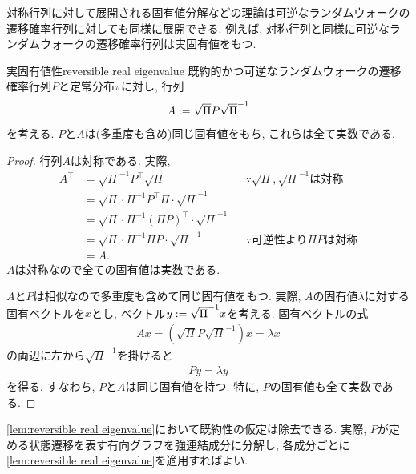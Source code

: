 対称行列に対して展開される固有値分解などの理論は可逆なランダムウォークの遷移確率行列に対しても同様に展開できる.
例えば, 対称行列と同様に可逆なランダムウォークの遷移確率行列は実固有値をもつ.
\begin{lemma}{実固有値性}{reversible real eigenvalue}
    既約的かつ可逆なランダムウォークの遷移確率行列$P$と定常分布$\pi$に対し,
    行列
    \begin{align}
        A \mathrel{:=} \sqrt{\Pi} P \sqrt{\Pi}^{-1} \label{eq: symmetrized P}
    \end{align}
    を考える.
    $P$と$A$は(多重度も含め)同じ固有値をもち, これらは全て実数である.
\end{lemma}
\begin{proof}
    行列$A$は対称である.
    実際,
    \begin{align*}
        A^\top & = \sqrt{\Pi}^{-1} P^{\top} \sqrt{\Pi}                            &  & \text{$\because$$\sqrt{\Pi},\sqrt{\Pi}^{-1}$は対称} \\
               & = \sqrt{\Pi} \cdot \Pi^{-1} P^{\top} \Pi \cdot \sqrt{\Pi}^{-1}                                                         \\
               & = \sqrt{\Pi} \cdot \Pi^{-1} (\Pi P)^{\top} \cdot \sqrt{\Pi}^{-1}                                                       \\
               & = \sqrt{\Pi} \cdot \Pi^{-1} \Pi P \cdot \sqrt{\Pi}^{-1}          &  & \text{$\because$可逆性より$\Pi P$は対称}                 \\
               & = A.
    \end{align*}
    $A$は対称なので全ての固有値は実数である.

    $A$と$P$は相似なので多重度も含めて同じ固有値をもつ. 実際,
    $A$の固有値$\lambda$に対する固有ベクトルを$x$とし, ベクトル$y\mathrel{:=} \sqrt{\Pi}^{-1}x$を考える.
    固有ベクトルの式
    \begin{align*}
        A x = (\sqrt{\Pi} P \sqrt{\Pi}^{-1})x =  \lambda x
    \end{align*}
    の両辺に左から$\sqrt{\Pi}^{-1}$を掛けると
    \begin{align*}
        P y = \lambda y
    \end{align*}
    を得る.
    すなわち, $P$と$A$は同じ固有値を持つ.
    特に, $P$の固有値も全て実数である.
\end{proof}
\cref{lem:reversible real eigenvalue}において既約性の仮定は除去できる.
実際, $P$が定める状態遷移を表す有向グラフを強連結成分に分解し,
各成分ごとに\cref{lem:reversible real eigenvalue}を適用すればよい.

